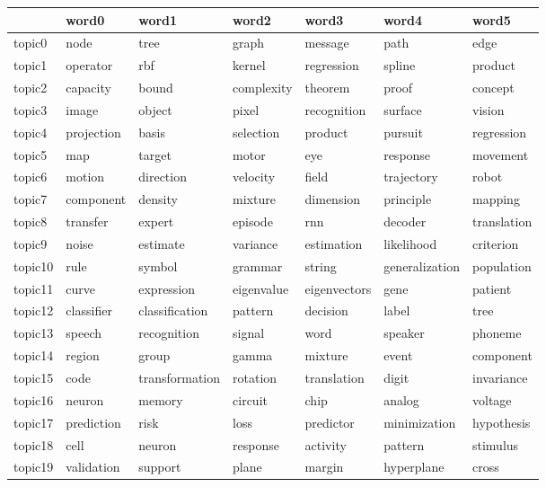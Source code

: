 \documentclass[letterpaper]{article}
\begin{document}
\begin{figure}[ht]
  \centering
  \begin{tabular}{l | l l l l l l}
    &     word0    &      word1 &          word2 &         word3 & word4 &        word5 \\ \hline
    topic0 & 	node & 	tree & 	graph & 	message & 	path & 	edge \\
    topic1 & 	operator & 	rbf & 	kernel & 	regression & 	spline & 	product \\
    topic2 & 	capacity & 	bound & 	complexity & 	theorem & 	proof & 	concept \\
    topic3 & 	image & 	object & 	pixel & 	recognition & 	surface & 	vision \\
    topic4 & 	projection & 	basis & 	selection & 	product & 	pursuit & 	regression \\
    topic5 & 	map & 	target & 	motor & 	eye & 	response & 	movement \\
    topic6 & 	motion & 	direction & 	velocity & 	field & 	trajectory & 	robot \\
    topic7 & 	component & 	density & 	mixture & 	dimension & 	principle & 	mapping \\
    topic8 & 	transfer & 	expert & 	episode & 	rnn & 	decoder & 	translation \\
    topic9 & 	noise & 	estimate & 	variance & 	estimation & 	likelihood & 	criterion \\
    topic10 & 	rule & 	symbol & 	grammar & 	string & 	generalization & 	population \\
    topic11 & 	curve & 	expression & 	eigenvalue & 	eigenvectors & 	gene & 	patient \\
    topic12 & 	classifier & 	classification & 	pattern & 	decision & 	label & 	tree \\
    topic13 & 	speech & 	recognition & 	signal & 	word & 	speaker & 	phoneme \\
    topic14 & 	region & 	group & 	gamma & 	mixture & 	event & 	component \\
    topic15 & 	code & 	transformation & 	rotation & 	translation & 	digit & 	invariance \\
    topic16 & 	neuron & 	memory & 	circuit & 	chip & 	analog & 	voltage \\
    topic17 & 	prediction & 	risk & 	loss & 	predictor & 	minimization & 	hypothesis \\
    topic18 & 	cell & 	neuron & 	response & 	activity & 	pattern & 	stimulus \\
    topic19 & 	validation & 	support & 	plane & 	margin & 	hyperplane & 	cross \\

\end{tabular}
\end{figure}
\end{document}
